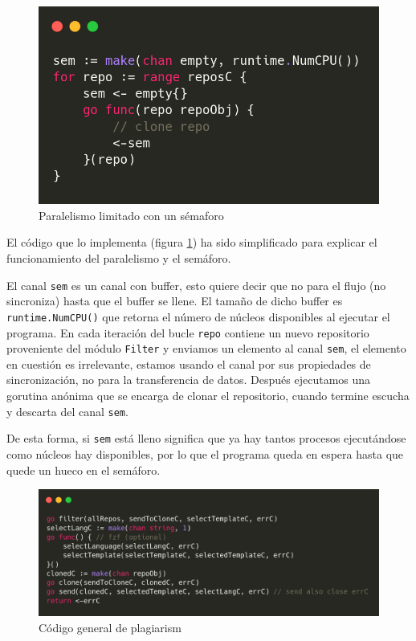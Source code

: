 \begin{figure}[H]
    \centering
    \includegraphics[width=0.5\linewidth]{images/concurrency-go.png}
    \caption{Paralelismo limitado con un sémaforo}
    \label{fig:concurrencyGo}
\end{figure}
El código que lo implementa (figura \ref{fig:concurrencyGo}) ha sido simplificado para explicar el funcionamiento del paralelismo y el semáforo.

El canal \verb|sem| es un canal con buffer, esto quiere decir que no para el flujo (no sincroniza) hasta que el buffer se llene. El tamaño de dicho buffer es \verb|runtime.NumCPU()| que retorna el número de núcleos disponibles al ejecutar el programa. En cada iteración del bucle \verb|repo| contiene un nuevo repositorio proveniente del módulo \verb|Filter| y enviamos un elemento al canal \verb|sem|, el elemento en cuestión es irrelevante, estamos usando el canal por sus propiedades de sincronización, no para la transferencia de datos. Después ejecutamos una gorutina anónima que se encarga de clonar el repositorio, cuando termine escucha y descarta del canal \verb|sem|.

De esta forma, si \verb|sem| está lleno significa que ya hay tantos procesos ejecutándose como núcleos hay disponibles, por lo que el programa queda en espera hasta que quede un hueco en el semáforo.


\begin{figure}[H]
    \centering
    \includegraphics[width=\linewidth]{images/go-code.png}
    \caption{Código general de plagiarism}
    \label{fig:goCode}
\end{figure}

 
